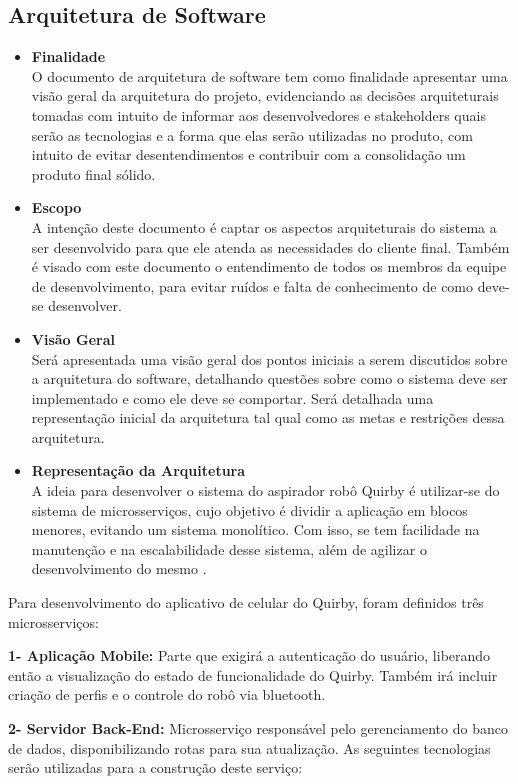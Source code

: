 \subsection{Arquitetura de Software}
\begin{itemize}
    \item \textbf{Finalidade} \\ O documento de arquitetura de software tem como finalidade apresentar uma visão geral da arquitetura do projeto, evidenciando as decisões arquiteturais tomadas com intuito de informar aos desenvolvedores e stakeholders quais serão as tecnologias e a forma que elas serão utilizadas no produto, com intuito de evitar desentendimentos e contribuir com a consolidação um produto final sólido.
    \item \textbf{Escopo} \\ A intenção deste documento é captar os aspectos arquiteturais do sistema a ser desenvolvido para que ele atenda as necessidades do cliente final. Também é visado com este documento o entendimento de todos os membros da equipe de desenvolvimento, para evitar ruídos e falta de conhecimento de como deve-se desenvolver.
    \item \textbf{Visão Geral} \\ Será apresentada uma visão geral dos pontos iniciais a serem discutidos sobre a arquitetura do software, detalhando questões sobre como o sistema deve ser implementado e como ele deve se comportar. Será detalhada uma representação inicial da arquitetura tal qual como as metas e restrições dessa arquitetura.
    \item\textbf{Representação da Arquitetura} \\ A ideia para desenvolver o sistema do aspirador robô Quirby é utilizar-se do sistema de microsserviços, cujo objetivo é dividir a aplicação em blocos menores, evitando um sistema monolítico. Com isso, se tem facilidade na manutenção e na escalabilidade desse sistema, além de agilizar o desenvolvimento do mesmo \cite{supero_2020}.
\end{itemize}

Para desenvolvimento do aplicativo de celular do Quirby, foram definidos três microsserviços:

\textbf{1- Aplicação Mobile:} Parte que exigirá a autenticação do usuário, liberando então a visualização do estado de funcionalidade do Quirby. Também irá incluir criação de perfis e o controle do robô via bluetooth.

\textbf{2- Servidor Back-End:} Microsserviço responsável pelo gerenciamento do banco de dados, disponibilizando rotas para sua atualização. As seguintes tecnologias serão utilizadas para a construção deste serviço:

